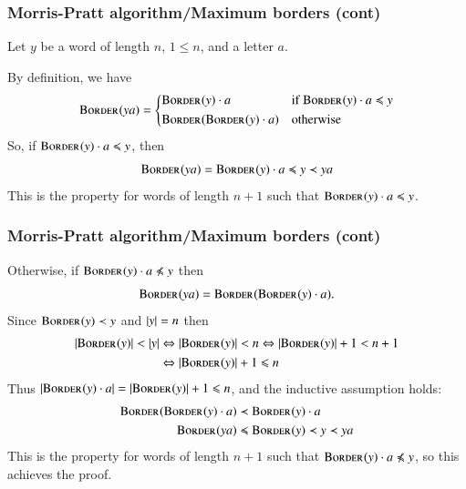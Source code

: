 %
\begin{frame}
\frametitle{Morris-Pratt algorithm/Maximum borders (cont)}

Let \(y\) be a word of length \(n\), \(1 \leqslant n\), and a letter
\(a\).

\bigskip

By definition, we have
\[
\textsc{Border}^{}(ya) = \left\{
\begin{aligned}
& \textsc{Border}^{}(y) \cdot a
&& \text{if} \; \textsc{Border}^{}(y) \cdot a \preccurlyeq y\\
& \textsc{Border}^{}(\textsc{Border}^{}(y) \cdot a)
&& \text{otherwise}
\end{aligned}
\right.
\]
So, if \(\textsc{Border}^{}(y) \cdot a \preccurlyeq y\), then
\[
\textsc{Border}^{}(ya) = \textsc{Border}^{}(y) \cdot a \preccurlyeq y \prec ya
\]
This is the property for words of length \(n+1\) such that
\(\textsc{Border}^{}(y) \cdot a \preccurlyeq y\).

\end{frame}

%
\begin{frame}
\frametitle{Morris-Pratt algorithm/Maximum borders (cont)}

Otherwise, if \(\Border{}{y} \cdot a \npreccurlyeq y\) then
\[
\textsc{Border}^{}(ya) = \textsc{Border}^{}(\textsc{Border}^{}(y) \cdot a).
\]
Since \(\textsc{Border}^{}(y) \prec y\) and \(\lvert{y}\lvert{} = n\) then
\begin{align*}
\lvert{\textsc{Border}^{}(y)}\lvert{} < \lvert{y}\lvert{}
&\Leftrightarrow
\lvert{\textsc{Border}^{}(y)}\lvert{} < n
\Leftrightarrow
\lvert{\textsc{Border}^{}(y)}\lvert{} + 1 < n + 1\\
&\Leftrightarrow
\lvert{\textsc{Border}^{}(y)}\lvert{} + 1 \leqslant n
\end{align*}
Thus \(\lvert{\textsc{Border}^{}(y) \cdot a}\lvert{} = \lvert{\textsc{Border}^{}(y)}\lvert{} + 1 \leqslant
n\), and the inductive assumption holds:
\begin{align*}
  \textsc{Border}^{}(\textsc{Border}^{}(y) \cdot a)
& \prec \textsc{Border}^{}(y) \cdot a\\
  \textsc{Border}^{}(ya)
& \preccurlyeq \textsc{Border}^{}(y) \prec y \prec ya
\end{align*}
This is the property for words of length \(n+1\) such that
\(\Border{}{y} \cdot a \npreccurlyeq y\), so this achieves the proof.

\end{frame}

